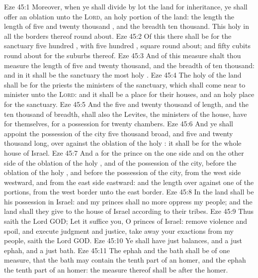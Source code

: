 \vs Eze 45:1 Moreover, when ye shall divide by lot the land for inheritance, ye shall offer an oblation unto the \textsc{Lord}, an holy portion of the land: the length  the length of five and twenty thousand , and the breadth  ten thousand. This  holy in all the borders thereof round about.
\vs Eze 45:2 Of this there shall be for the sanctuary five hundred , with five hundred , square round about; and fifty cubits round about for the suburbs thereof.
\vs Eze 45:3 And of this measure shalt thou measure the length of five and twenty thousand, and the breadth of ten thousand: and in it shall be the sanctuary  the most holy .
\vs Eze 45:4 The holy  of the land shall be for the priests the ministers of the sanctuary, which shall come near to minister unto the \textsc{Lord}: and it shall be a place for their houses, and an holy place for the sanctuary.
\vs Eze 45:5 And the five and twenty thousand of length, and the ten thousand of breadth, shall also the Levites, the ministers of the house, have for themselves, for a possession for twenty chambers.
\vs Eze 45:6 And ye shall appoint the possession of the city five thousand broad, and five and twenty thousand long, over against the oblation of the holy : it shall be for the whole house of Israel.
\vs Eze 45:7 And a  for the prince on the one side and on the other side of the oblation of the holy , and of the possession of the city, before the oblation of the holy , and before the possession of the city, from the west side westward, and from the east side eastward: and the length  over against one of the portions, from the west border unto the east border.
\vs Eze 45:8 In the land shall be his possession in Israel: and my princes shall no more oppress my people; and  the land shall they give to the house of Israel according to their tribes.
\vs Eze 45:9 Thus saith the Lord GOD; Let it suffice you, O princes of Israel: remove violence and spoil, and execute judgment and justice, take away your exactions from my people, saith the Lord GOD.
\vs Eze 45:10 Ye shall have just balances, and a just ephah, and a just bath.
\vs Eze 45:11 The ephah and the bath shall be of one measure, that the bath may contain the tenth part of an homer, and the ephah the tenth part of an homer: the measure thereof shall be after the homer.
